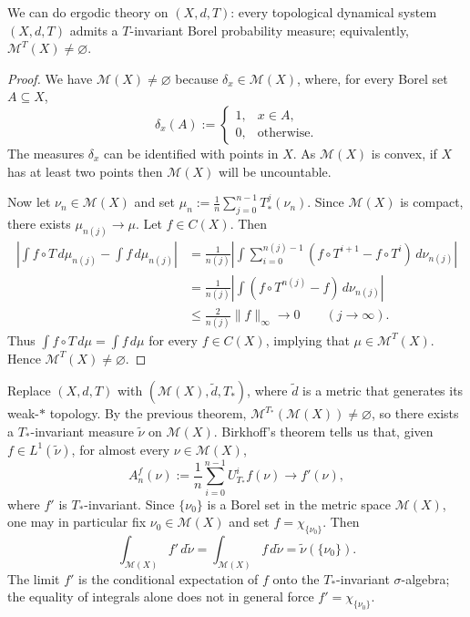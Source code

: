 \documentclass[11pt,a4paper]{article}
\begin{document}
\setcounter{theorem}{18}\begin{theorem}\label{thm:l6-kb}
We can do ergodic theory on $(X,d,T)$: every topological dynamical system
$(X,d,T)$ admits a $T$-invariant Borel probability measure; equivalently,
$\mathcal M^T(X)\neq\varnothing$.
\end{theorem}
\begin{proof}
We have $\mathcal M(X)\neq\varnothing$ because $\delta_x\in\mathcal M(X)$, where, for every Borel set $A\subseteq X$,
\[
 \delta_x(A):=\begin{cases}1,&x\in A,\\0,&\text{otherwise}.\end{cases}
\]
The measures $\delta_x$ can be identified with points in $X$. As
$\mathcal M(X)$ is convex, if $X$ has at least two points then
$\mathcal M(X)$ will be uncountable.

Now let $\nu_n\in\mathcal M(X)$ and set $\mu_n:=\frac1n\sum_{j=0}^{n-1}T_*^j(\nu_n)$. Since $\mathcal M(X)$ is compact, there exists $\mu_{n(j)}\to\mu$. Let $f\in C(X)$. Then
\[
\begin{aligned}
 \left|\int f\circ T\,d\mu_{n(j)}-\int f\,d\mu_{n(j)}\right|
 &=\frac1{n(j)}\left|\int\sum_{i=0}^{n(j)-1}
    (f\circ T^{i+1}-f\circ T^i)\,d\nu_{n(j)}\right|\\
 &=\frac1{n(j)}\left|\int(f\circ T^{n(j)}-f)\,d\nu_{n(j)}\right|\\
 &\leq\frac2{n(j)}\|f\|_\infty\longrightarrow0
 \qquad(j\to\infty).
\end{aligned}
\]
Thus $\int f\circ T\,d\mu=\int f\,d\mu$ for every $f\in C(X)$, implying that $\mu\in\mathcal M^T(X)$. Hence $\mathcal M^T(X)\neq\varnothing$.
\end{proof}

\begin{remark}
Replace $(X,d,T)$ with $(\mathcal M(X),\widetilde d,T_*)$, where
$\widetilde d$ is a metric that generates its weak-$*$ topology. By the
previous theorem, $\mathcal M^{T_*}(\mathcal M(X))\neq\varnothing$, so there
exists a $T_*$-invariant measure $\widetilde\nu$ on $\mathcal M(X)$.
Birkhoff's theorem tells us that, given $f\in L^1(\widetilde\nu)$, for almost
every $\nu\in\mathcal M(X)$,
\[
 A_n^f(\nu):=\frac1n\sum_{i=0}^{n-1}U_{T_*}^i f(\nu)
 \longrightarrow f'(\nu),
\]
where $f'$ is $T_*$-invariant. Since $\{\nu_0\}$ is a Borel set in the metric
space $\mathcal M(X)$, one may in particular fix $\nu_0\in\mathcal M(X)$ and
set $f=\chi_{\{\nu_0\}}$. Then
\[
 \int_{\mathcal M(X)}f'\,d\widetilde\nu
 =\int_{\mathcal M(X)}f\,d\widetilde\nu
 =\widetilde\nu(\{\nu_0\}).
\]
The limit $f'$ is the conditional expectation of $f$ onto the
$T_*$-invariant $\sigma$-algebra; the equality of integrals alone does not in
general force $f'=\chi_{\{\nu_0\}}$.
\end{remark}
\end{document}

